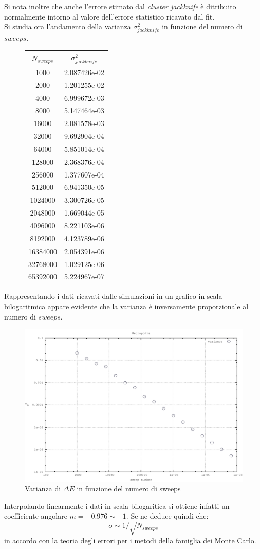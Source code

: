 Si nota inoltre che anche l'errore stimato dal \textit{cluster jackknife} è ditribuito normalmente intorno al valore dell'errore statistico ricavato dal fit.
\\

Si studia ora l'andamento della varianza $\sigma^2_{jackknife}$ in funzione del numero di $sweeps$.
\begin{figure}[H]
\centering
\begin{tabular}{|c|c|}
\hline
$N_{sweeps}$ & $\sigma^2_{jackknife}$\\
\hline
1000 & 2.087426e-02\\
2000 & 1.201255e-02\\
4000 & 6.999672e-03\\
8000 & 5.147464e-03\\
16000 & 2.081578e-03\\
32000 & 9.692904e-04\\
64000 & 5.851014e-04\\
128000 & 2.368376e-04\\
256000 & 1.377607e-04\\
512000 & 6.941350e-05\\
1024000 & 3.300726e-05\\
2048000 & 1.669044e-05\\
4096000 & 8.221103e-06\\
8192000 & 4.123789e-06\\
16384000 & 2.054391e-06\\
32768000 & 1.029125e-06\\
65392000 & 5.224967e-07\\
\hline
\end{tabular}
\label{tab:variance_tab}
\end{figure}
Rappresentando i dati ricavati dalle simulazioni in un grafico in scala bilogaritmica appare evidente che la varianza è inversamente proporzionale al numero di $sweeps$.
\begin{figure}[H]
\centering
\includegraphics[width=\textwidth]{variance}
\caption{Varianza di $\Delta E$ in funzione del numero di sweeps}
\label{fig:variance}
\end{figure}
Interpolando linearmente i dati in scala bilogaritica si ottiene infatti un coefficiente angolare $m=-0.976\sim-1$. Se ne deduce quindi che: 
$$\sigma\sim1/\sqrt{N_{sweeps}}$$
in accordo con la teoria degli errori per i metodi della famiglia dei Monte Carlo.
